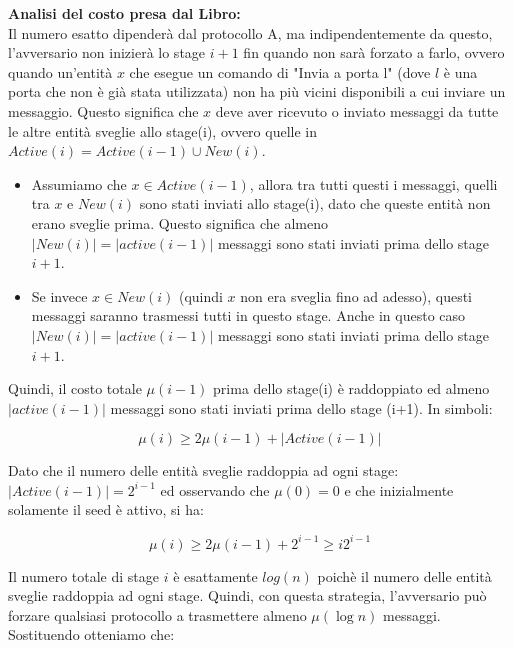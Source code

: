 \textbf{Analisi del costo presa dal Libro:}\\
Il numero esatto dipenderà dal protocollo A, ma indipendentemente da questo,
l'avversario non inizierà lo stage $i+1$ fin quando non sarà forzato a farlo,
ovvero quando un'entità $x$ che esegue un comando di "Invia a porta l" (dove $l$
è una porta che non è già stata utilizzata) non ha più vicini disponibili a cui
inviare un messaggio. Questo significa che $x$ deve aver ricevuto o inviato
messaggi da tutte le altre entità sveglie allo stage(i), ovvero quelle in
$Active(i) = Active(i-1) \cup New (i)$.

\begin{itemize}
    \item Assumiamo che $x \in Active(i-1)$, allora tra tutti questi i messaggi,
          quelli tra $x$ e $New(i)$ sono stati inviati allo stage(i), dato che queste
          entità non erano sveglie prima. Questo significa che almeno
          $|New(i)|=|active(i-1)|$ messaggi sono stati inviati prima dello stage $i+1$.
    \item Se invece $x \in New(i)$ (quindi $x$ non era sveglia fino ad adesso),
          questi messaggi saranno trasmessi tutti in questo stage. Anche in questo caso
          $|New(i)|=|active(i-1)|$ messaggi sono stati inviati prima dello stage $i+1$.
\end{itemize}

Quindi, il costo totale $\mu(i-1)$ prima dello stage(i) è raddoppiato ed almeno
$|active(i-1)|$ messaggi sono stati inviati prima dello stage (i+1). In simboli:


$$\mu(i) \geq 2\mu(i-1) + |Active(i-1)|$$

Dato che il numero delle entità sveglie raddoppia ad ogni stage: $|Active(i-1)|
    = 2^{i-1}$ ed osservando che $\mu(0) = 0$ e che inizialmente solamente il seed è
attivo, si ha:

$$\mu(i) \geq 2\mu(i-1)+2^{i-1} \geq i2^{i-1}$$

Il numero totale di stage $i$ è esattamente $log(n)$ poichè il numero delle
entità sveglie raddoppia ad ogni stage. Quindi, con questa strategia,
l'avversario può forzare qualsiasi protocollo a trasmettere almeno $\mu(\log n)$
messaggi. Sostituendo otteniamo che:

